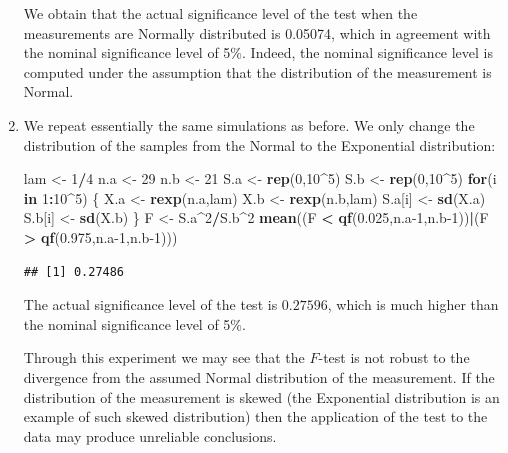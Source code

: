 \documentclass[
]{krantz}
\makeatletter
\newenvironment{Shaded}{\begin{snugshade}}{\end{snugshade}}
\newcommand{\ControlFlowTok}[1]{\textcolor[rgb]{0.13,0.29,0.53}{\textbf{#1}}}
\newcommand{\DecValTok}[1]{\textcolor[rgb]{0.00,0.00,0.81}{#1}}
\newcommand{\FloatTok}[1]{\textcolor[rgb]{0.00,0.00,0.81}{#1}}
\newcommand{\KeywordTok}[1]{\textcolor[rgb]{0.13,0.29,0.53}{\textbf{#1}}}
\newcommand{\NormalTok}[1]{#1}
\newcommand{\OperatorTok}[1]{\textcolor[rgb]{0.81,0.36,0.00}{\textbf{#1}}}
\newcommand{\StringTok}[1]{\textcolor[rgb]{0.31,0.60,0.02}{#1}}
\newenvironment{kframe}{%
\medskip{}
\setlength{\fboxsep}{.8em}
 \def\at@end@of@kframe{}%
 \ifinner\ifhmode%
  \def\at@end@of@kframe{\end{minipage}}%
  \begin{minipage}{\columnwidth}%
 \fi\fi%
 \def\FrameCommand##1{\hskip\@totalleftmargin \hskip-\fboxsep
 \colorbox{shadecolor}{##1}\hskip-\fboxsep
     \hskip-\linewidth \hskip-\@totalleftmargin \hskip\columnwidth}%
 \MakeFramed {\advance\hsize-\width
   \@totalleftmargin\z@ \linewidth\hsize
   \@setminipage}}%
 {\par\unskip\endMakeFramed%
 \at@end@of@kframe}
\renewenvironment{Shaded}{\begin{kframe}}{\end{kframe}}
\theoremstyle{definition}
\theoremstyle{definition}
\theoremstyle{definition}
\theoremstyle{remark}
\makeatother
\begin{document}
\begin{enumerate}
  We obtain that the actual significance level of the test when the
  measurements are Normally distributed is 0.05074, which in agreement
  with the nominal significance level of 5\%. Indeed, the nominal
  significance level is computed under the assumption that the
  distribution of the measurement is Normal.
\item
  We repeat essentially the same
  simulations as before. We only change the distribution of the samples
  from the Normal to the Exponential distribution:

\begin{Shaded}
\begin{Highlighting}[]
\NormalTok{lam <-}\StringTok{ }\DecValTok{1}\OperatorTok{/}\DecValTok{4}
\NormalTok{n.a <-}\StringTok{ }\DecValTok{29}
\NormalTok{n.b <-}\StringTok{ }\DecValTok{21}
\NormalTok{S.a <-}\StringTok{ }\KeywordTok{rep}\NormalTok{(}\DecValTok{0}\NormalTok{,}\DecValTok{10}\OperatorTok{^}\DecValTok{5}\NormalTok{)}
\NormalTok{S.b <-}\StringTok{ }\KeywordTok{rep}\NormalTok{(}\DecValTok{0}\NormalTok{,}\DecValTok{10}\OperatorTok{^}\DecValTok{5}\NormalTok{)}
\ControlFlowTok{for}\NormalTok{(i }\ControlFlowTok{in} \DecValTok{1}\OperatorTok{:}\DecValTok{10}\OperatorTok{^}\DecValTok{5}\NormalTok{) \{}
\NormalTok{  X.a <-}\StringTok{ }\KeywordTok{rexp}\NormalTok{(n.a,lam)}
\NormalTok{  X.b <-}\StringTok{ }\KeywordTok{rexp}\NormalTok{(n.b,lam)}
\NormalTok{  S.a[i] <-}\StringTok{ }\KeywordTok{sd}\NormalTok{(X.a)}
\NormalTok{  S.b[i] <-}\StringTok{ }\KeywordTok{sd}\NormalTok{(X.b)}
\NormalTok{\}}
\NormalTok{F <-}\StringTok{ }\NormalTok{S.a}\OperatorTok{^}\DecValTok{2}\OperatorTok{/}\NormalTok{S.b}\OperatorTok{^}\DecValTok{2}
\KeywordTok{mean}\NormalTok{((F }\OperatorTok{<}\StringTok{ }\KeywordTok{qf}\NormalTok{(}\FloatTok{0.025}\NormalTok{,n.a}\DecValTok{-1}\NormalTok{,n.b}\DecValTok{-1}\NormalTok{))}\OperatorTok{|}\NormalTok{(F }\OperatorTok{>}\StringTok{ }\KeywordTok{qf}\NormalTok{(}\FloatTok{0.975}\NormalTok{,n.a}\DecValTok{-1}\NormalTok{,n.b}\DecValTok{-1}\NormalTok{)))}
\end{Highlighting}
\end{Shaded}

\begin{verbatim}
## [1] 0.27486
\end{verbatim}

  The actual significance level of the test is \(0.27596\), which is much
  higher than the nominal significance level of 5\%.

  Through this experiment we may see that the \(F\)-test is not robust to
  the divergence from the assumed Normal distribution of the measurement.
  If the distribution of the measurement is skewed (the Exponential
  distribution is an example of such skewed distribution) then the
  application of the test to the data may produce unreliable conclusions.
\end{enumerate}
\end{document}
